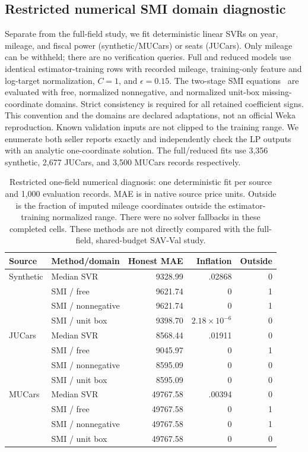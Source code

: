 \subsection{Restricted numerical SMI domain diagnostic}
Separate from the full-field study, we fit deterministic linear SVRs
on year, mileage, and fiscal power (synthetic/MUCars) or seats (JUCars). Only mileage
can be withheld; there are no verification queries. Full and reduced
models use identical estimator-training rows with recorded mileage,
training-only feature and log-target normalization, $C=1$, and
$\epsilon=0.15$. The two-stage SMI equations~\cite{zhang2020strategic}
are evaluated with free, normalized nonnegative, and normalized unit-box
missing-coordinate domains. Strict consistency is required for all
retained coefficient signs. This convention and the domains are declared
adaptations, not an official Weka reproduction. Known validation inputs
are not clipped to the training range. We enumerate both seller reports
exactly and independently check the LP outputs with an analytic
one-coordinate solution. The full/reduced fits use 3,356 synthetic,
2,677 JUCars, and 3,500 MUCars records respectively.

\begin{table}[t]
\centering
\caption{Restricted one-field numerical diagnosis: one deterministic fit
per source and 1,000 evaluation records. MAE is in native source price
units. Outside is the fraction of imputed mileage coordinates outside the
estimator-training normalized range. There were no solver fallbacks in
these completed cells. These methods are not directly compared with the
full-field, shared-budget SAV-Val study.}
\label{tab:numeric_smi}
\begin{tabular}{llrrr}
\toprule
Source & Method/domain & Honest MAE & Inflation & Outside\\
\midrule
Synthetic & Median SVR & 9328.99 & .02868 & 0\\
 & SMI / free & 9621.74 & 0 & 1\\
 & SMI / nonnegative & 9621.74 & 0 & 1\\
 & SMI / unit box & 9398.70 & $2.18\!\times\!10^{-6}$ & 0\\
\midrule
JUCars & Median SVR & 8568.44 & .01911 & 0\\
 & SMI / free & 9045.97 & 0 & 1\\
 & SMI / nonnegative & 8595.09 & 0 & 0\\
 & SMI / unit box & 8595.09 & 0 & 0\\
\midrule
MUCars & Median SVR & 49767.58 & .00394 & 0\\
 & SMI / free & 49767.58 & 0 & 1\\
 & SMI / nonnegative & 49767.58 & 0 & 1\\
 & SMI / unit box & 49767.58 & 0 & 0\\
\bottomrule
\end{tabular}
\end{table}

